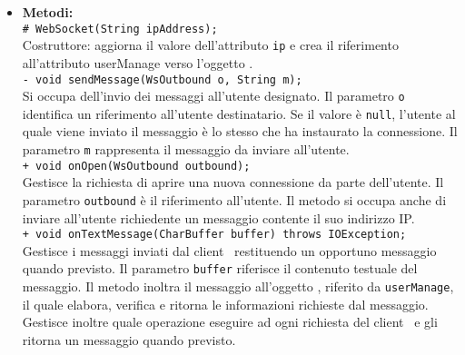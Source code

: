 {{\begin{sloppypar}
{{{\begin{itemize}
{					\texttt{- String ip}: valore dell'IP\g~ del client\g~ che ha effettuato la connessione.\\
					
					\texttt{- IManageWSU userManage}: riferimento all'oggetto  per l'interpretazione dei messaggi in ingresso e creazione dei messaggi d'invio.\\
					}
			
				\item[] \textbf{Metodi:}{\\
					  \texttt{\# WebSocket(String ipAddress);}\\
					  Costruttore: aggiorna il valore dell'attributo \texttt{ip} e crea il riferimento all'attributo userManage verso l'oggetto .\\
		  
					  \texttt{- void sendMessage(WsOutbound o, String m);}\\
					  Si occupa dell'invio dei messaggi all'utente designato. Il parametro \texttt{o} identifica un riferimento all'utente destinatario. Se il valore è \texttt{null}, l'utente al quale viene inviato il messaggio è lo stesso che ha instaurato la connessione.
					  Il parametro \texttt{m} rappresenta il messaggio da inviare all'utente.\\
					  
					  \texttt{+ void onOpen(WsOutbound outbound);}\\
					  Gestisce la richiesta di aprire una nuova connessione da parte dell'utente.
					  Il parametro \texttt{outbound} è il riferimento all'utente.
					  Il metodo si occupa anche di inviare all'utente richiedente un messaggio contente il suo indirizzo IP\g.\\
					  
					  \texttt{+ void onTextMessage(CharBuffer buffer) throws IOException;}\\
					  Gestisce i messaggi inviati dal client\g~ restituendo un opportuno messaggio quando previsto.
					  Il parametro \texttt{buffer} riferisce il contenuto testuale del messaggio.
					  Il metodo inoltra il messaggio all'oggetto , riferito da \texttt{userManage}, il quale elabora, verifica e ritorna le informazioni richieste dal messaggio.
					  Gestisce inoltre quale operazione eseguire ad ogni richiesta del client\g~ e gli ritorna un messaggio quando previsto.\\
					  
}
\end{itemize}}}}
\end{sloppypar}}}
